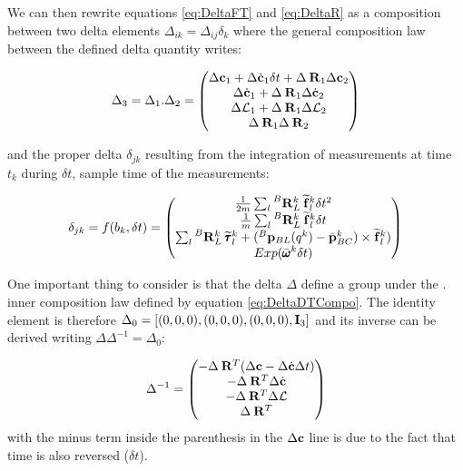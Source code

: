 \documentclass[11pt]{article}
\newcommand{\Rot}[2]{\prescript{#1}{}{\bfR}_{#2}}
\newcommand{\posi}[2]{\prescript{#1}{}{\bfp}_{#2}}
\newcommand{\posibar}{\bar{\bfp}}
\newcommand{\angvelbar}{\bar{\pmb{\omega}}}
\newcommand{\forcem}[2]{\prescript{#1}{}{\widetilde{\bff}}_{#2}}
\newcommand{\torquem}[2]{\prescript{#1}{}{\widetilde{\pmb{\tau}}}_{#2}}
\newcommand{\AM}{\mathcal{L}}
\newcommand{\COM}{\bfc}
\newcommand{\COMd}{\dot{\bfc}}
\newcommand{\Ident}{\bfI}
\begin{document}
We can then rewrite equations  \ref{eq:DeltaFT} and \ref{eq:DeltaR} as a composition between two delta elements $\Delta_{ik} = \Delta_{ij} \delta_k$ where the general composition law between the defined delta quantity writes:

\begin{equation}
    \Delta_3 = \Delta_1 . \Delta_2 = 
    \begin{pmatrix}
    \Delta \COM_1 + \Delta \COMd_1 \delta t + \Delta \Rot{}{1}  \Delta \COM_2
    \\
    \Delta \COMd_1 + \Delta \Rot{}{1}  \Delta \COMd_2
    \\
    \Delta \AM_1 + \Delta \Rot{}{1}  \Delta \AM_2
    \\
    \Delta \Rot{}{1}\Delta \Rot{}{2}
    \end{pmatrix}
    \label{eq:DeltaDTCompo}
\end{equation}

and the proper delta $\delta_{jk}$ resulting from the integration of measurements at time $t_k$ during $\delta t$, sample time of the measurements:

\begin{equation}
    \delta_{jk} =
    f(b_k, \delta t) =
    \begin{pmatrix}
    \frac{1}{2m} \sum_l \Rot{B}{L}^{k} \forcem{}{l}^{k} \delta t^2
    \\
    \frac{1}{m} \sum_l \Rot{B}{L}^{k} \forcem{}{l}^{k} \delta t 
    \\
    \sum_l \Rot{B}{L}^{k} \torquem{}{l}^{k} +  (\posi{B}{BL}(q^k) - \posibar_{BC}^k) \times \forcem{}{l}^{k})
    \\
    Exp(\angvelbar^k\delta t)
    \end{pmatrix}
\end{equation}

One important thing to consider is that the delta $\Delta$ define a group under the $.$ inner composition law defined by equation \ref{eq:DeltaDTCompo}. The identity element is therefore $\Delta_0 = \left[ (0,0,0), (0,0,0), (0,0,0), \Ident_3 \right]$ and its inverse can be derived writing $\Delta \Delta^{-1} = \Delta_0$:

\begin{equation}
	\Delta^{-1} =
	\begin{pmatrix}
	 - \Delta \Rot{}{}^T (\Delta\COM - \Delta\COMd \Delta t)
	 \\
	 - \Delta \Rot{}{}^T \Delta \COMd
	 \\
	 - \Delta \Rot{}{}^T \Delta\AM
	 \\
	 \Delta \Rot{}{}^T
	\end{pmatrix}
\end{equation}
with the minus term inside the parenthesis in the $\Delta\COM$ line is due to the fact that time is also reversed ($\delta t$).
\end{document}
